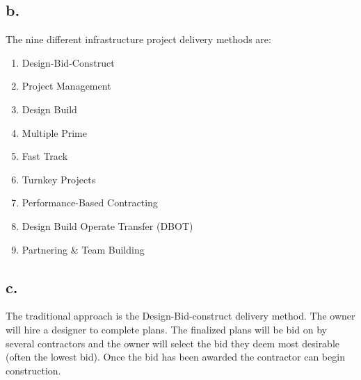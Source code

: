 \documentclass[12pt]{article}
\renewcommand{\=}[1]{\stackrel{#1}{=}} %
\theoremstyle{definition}
\theoremstyle{remark}
\begin{document}
\subsection{b.}
The nine different infrastructure project delivery methods are:
\begin{enumerate}
	\item Design-Bid-Construct
	\item Project Management
	\item Design Build
	\item Multiple Prime
	\item Fast Track
	\item Turnkey Projects
	\item Performance-Based Contracting
	\item Design Build Operate Transfer (DBOT)
	\item Partnering \& Team Building
\end{enumerate}

\subsection{c.}
The traditional approach is the Design-Bid-construct delivery method. The owner will hire a designer to complete plans. The finalized plans will be bid on by several contractors and the owner will select the bid they deem most desirable (often the lowest bid). Once the bid has been awarded the contractor can begin construction.
\end{document}
